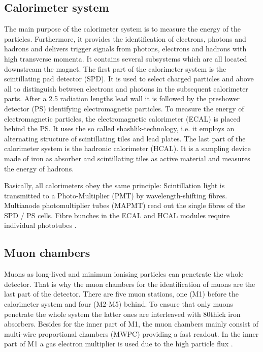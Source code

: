 \subsection{Calorimeter system}
The main purpose of the calorimeter system is to measure the energy of the particles.
Furthermore, it provides the identification of electrons, photons and hadrons and delivers trigger signals from photons, electrons and hadrons with high transverse momenta.
It contains several subsystems which are all located downstream the magnet.
The first part of the calorimeter system is the scintillating pad detector (SPD).
It is used to select charged particles and above all to distinguish between electrons and photons in the subsequent calorimeter parts.
After a 2.5 radiation lengths lead wall it is followed by the preshower detector (PS) identifying electromagnetic particles.
To measure the energy of electromagnetic particles, the electromagnetic calorimeter (ECAL) is placed behind the PS.
It uses the so called shashlik-technology, i.e. it employs an alternating structure of scintillating tiles and lead plates.
The last part of the calorimeter system is the hadronic calorimeter (HCAL).
It is a sampling device made of iron as absorber and scintillating tiles as active material and measures the energy of hadrons.

Basically, all calorimeters obey the same principle:
Scintillation light is transmitted to a Photo-Multiplier (PMT) by wavelength-shifting fibres.
Multianode photomultiplier tubes (MAPMT) read out the single fibres of the SPD / PS cells.
Fibre bunches in the ECAL and HCAL modules require individual phototubes \cite{detector, PS_SPD, Calorimeter_Running, ECAL, HCAL}.

\subsection{Muon chambers}
Muons as long-lived and minimum ionising particles can penetrate the whole detector.
That is why the muon chambers for the identification of muons are the last part of the detector.
There are five muon stations, one (M1) before the calorimeter system and four (M2-M5) behind.
To ensure that only muons penetrate the whole system the latter ones are interleaved with 80\cm thick iron absorbers.
Besides for the inner part of M1, the muon chambers mainly consist of multi-wire proportional chambers (MWPC) providing a fast readout.
In the inner part of M1 a gas electron multiplier is used due to the high particle flux \cite{detector, Muon_Performance}.

